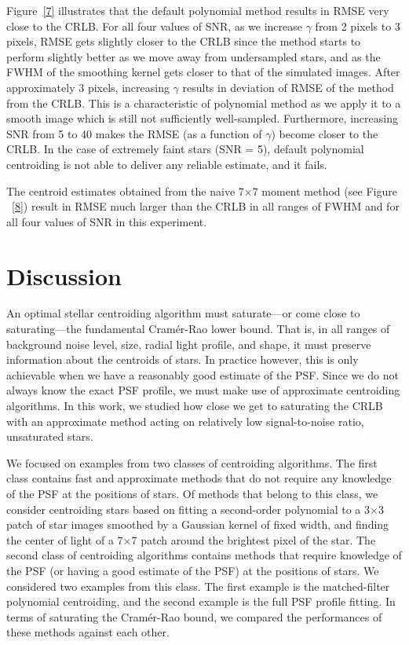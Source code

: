 \documentclass[12pt, preprint]{aastex}
\begin{document}
Figure~\ref{7} illustrates that the default polynomial method results in RMSE very close to the CRLB.
For all four values of SNR, as we increase $\gamma$ from 2 pixels to 3 pixels,
RMSE gets slightly closer to the CRLB since the method starts to perform
slightly better as we move away from undersampled stars, and as the FWHM of the smoothing kernel
gets closer to that of the simulated images.
After approximately 3 pixels, increasing $\gamma$ results in deviation of RMSE of the method from the CRLB.
This is a characteristic of polynomial method as we apply it to a smooth image which is still not sufficiently
well-sampled.  Furthermore, increasing SNR from 5 to 40 makes the RMSE (as a function of $\gamma$) become
closer to the CRLB. In the case of extremely faint stars (SNR = 5),
default polynomial centroiding is not able to deliver any reliable estimate, and it fails.

The centroid estimates obtained from the naive 7$\times$7 moment method (see Figure ~\ref{8})
result in RMSE much larger than the CRLB in all ranges of FWHM and for all four
values of SNR in this experiment. 

\section{Discussion}\label{sec:discussion}

An optimal stellar centroiding algorithm must saturate---or come close to saturating---the fundamental Cram\'{e}r-Rao lower 
bound. That is, in all ranges of background noise level, size, radial light profile,
and shape, it must preserve information about the centroids of stars. In practice however,
this is only achievable when we have a reasonably good estimate of the PSF. Since we do not always 
know the exact PSF profile, we must make use of approximate centroiding algorithms. In this work, we
studied how close we get to saturating the CRLB with an approximate method acting on relatively low signal-to-noise ratio,
unsaturated stars.
 
We focused on examples from two classes of centroiding algorithms. The first class contains fast and approximate
methods that do not require any knowledge of the PSF at the positions of stars. Of methods that belong to this class,
we consider centroiding stars based on fitting a second-order
polynomial to a 3$\times$3 patch of star images smoothed by a Gaussian kernel of fixed width, and finding the center of light 
of a 7$\times$7 patch around the brightest pixel of the star.
The second class of centroiding algorithms contains methods that require knowledge of the PSF (or having a good estimate
of the PSF) at the positions of stars. We considered two examples from this class. The first example
is the matched-filter polynomial centroiding, and the
second example is the full PSF profile fitting. In terms of saturating the Cram\'{e}r-Rao bound, we compared 
the performances of these methods against each other.
\end{document}

